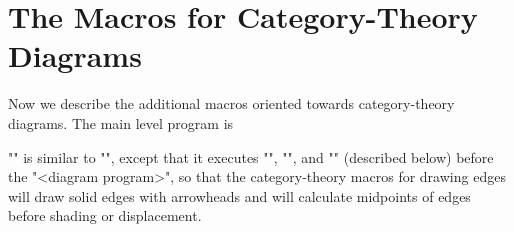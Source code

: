 \documentclass[11pt]{article}
\begin{document}
\cleardoublepage
\section{The Macros for Category-Theory Diagrams}

Now we describe the additional macros oriented towards category-theory
diagrams.  The main level program is
\begin{myverb}
\end{myverb}
"\ctdiagram" is similar to "\diagram", except that it executes "\ctsolid",
"\cthead", and "\ctoutermid" (described below) before the "<diagram program>",
so that the category-theory macros for drawing edges will draw solid edges
with arrowheads and will calculate midpoints of edges before shading or
displacement.
\end{document}
